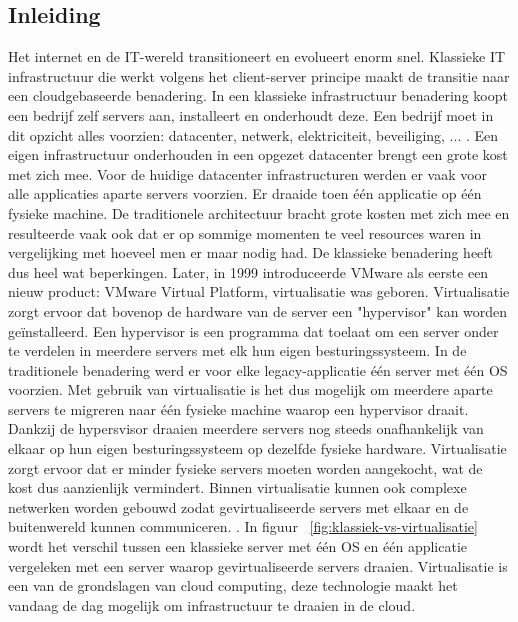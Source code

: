 \subsection{Inleiding}
Het internet en de IT-wereld transitioneert en evolueert enorm snel. Klassieke IT infrastructuur die werkt volgens het client-server principe maakt de transitie naar een cloudgebaseerde benadering. In een klassieke infrastructuur benadering koopt een bedrijf zelf servers aan, installeert en onderhoudt deze. Een bedrijf moet in dit opzicht alles voorzien: datacenter, netwerk, elektriciteit, beveiliging, ... . Een eigen infrastructuur onderhouden in een opgezet datacenter brengt een grote kost met zich mee. Voor de huidige datacenter infrastructuren werden er vaak voor alle applicaties aparte servers voorzien. Er draaide toen één applicatie op één fysieke machine. De traditionele architectuur bracht grote kosten met zich mee en resulteerde vaak ook dat er op sommige momenten te veel resources waren in vergelijking met hoeveel men er maar nodig had. De klassieke benadering heeft dus heel wat beperkingen. 
\newline
\newline
Later, in 1999 introduceerde VMware als eerste een nieuw product: VMware Virtual Platform, virtualisatie was geboren. Virtualisatie zorgt ervoor dat bovenop de hardware van de server een "hypervisor" kan worden geïnstalleerd. Een hypervisor is een programma dat toelaat om een server onder te verdelen in meerdere servers met elk hun eigen besturingssysteem. In de traditionele benadering werd er voor elke legacy-applicatie één server met één OS voorzien. Met gebruik van virtualisatie is het dus mogelijk om meerdere aparte servers te migreren naar één fysieke machine waarop een hypervisor draait. Dankzij de hypersvisor draaien meerdere servers nog steeds onafhankelijk van elkaar op hun eigen besturingssysteem op dezelfde fysieke hardware. Virtualisatie zorgt ervoor dat er minder fysieke servers moeten worden aangekocht, wat de kost dus aanzienlijk vermindert. Binnen virtualisatie kunnen ook complexe netwerken worden gebouwd zodat gevirtualiseerde servers met elkaar en de buitenwereld kunnen communiceren. \autocite{RedHat2019}. In 
figuur ~\ref{fig:klassiek-vs-virtualisatie} wordt het verschil tussen een klassieke server met één OS en één applicatie vergeleken met een server waarop gevirtualiseerde servers draaien. Virtualisatie is een van de grondslagen van cloud computing, deze technologie maakt het vandaag de dag mogelijk om infrastructuur te draaien in de cloud.
\newline
